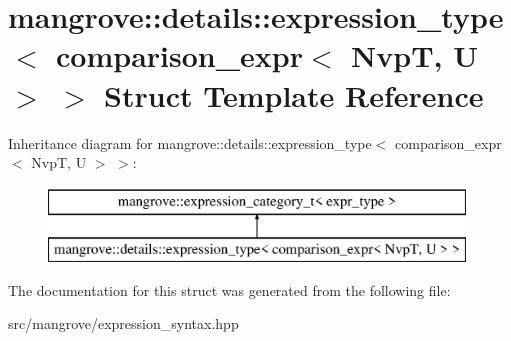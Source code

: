 \hypertarget{structmangrove_1_1details_1_1expression__type_3_01comparison__expr_3_01NvpT_00_01U_01_4_01_4}{}\section{mangrove\+:\+:details\+:\+:expression\+\_\+type$<$ comparison\+\_\+expr$<$ NvpT, U $>$ $>$ Struct Template Reference}
\label{structmangrove_1_1details_1_1expression__type_3_01comparison__expr_3_01NvpT_00_01U_01_4_01_4}
Inheritance diagram for mangrove\+:\+:details\+:\+:expression\+\_\+type$<$ comparison\+\_\+expr$<$ NvpT, U $>$ $>$\+:\begin{figure}[H]
\begin{center}
\leavevmode
\includegraphics[height=2.000000cm]{structmangrove_1_1details_1_1expression__type_3_01comparison__expr_3_01NvpT_00_01U_01_4_01_4}
\end{center}
\end{figure}


The documentation for this struct was generated from the following file\+:\begin{DoxyCompactItemize}
\item 
src/mangrove/expression\+\_\+syntax.\+hpp\end{DoxyCompactItemize}
